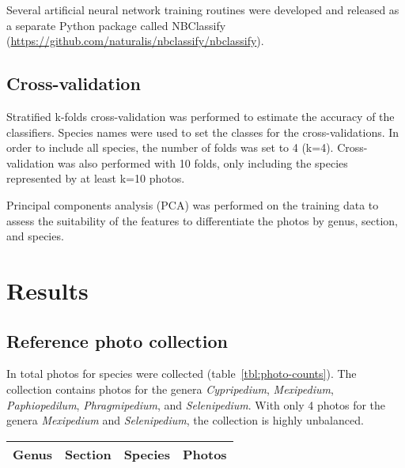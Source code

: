 \documentclass[review,3p,twocolumn]{elsarticle}
\begin{document}
Several artificial neural network training routines were developed and released as a separate Python package called NBClassify (\url{https://github.com/naturalis/nbclassify/nbclassify}).

\subsection{Cross-validation}

Stratified k-folds cross-validation was performed to estimate the accuracy of the classifiers. Species names were used to set the classes for the cross-validations. In order to include all species, the number of folds was set to 4 (k=4). Cross-validation was also performed with 10 folds, only including the species represented by at least k=10 photos.

Principal components analysis (PCA) was performed on the training data to assess the suitability of the features to differentiate the photos by genus, section, and species.

\section{Results}
\label{sect:results}

\subsection{Reference photo collection}

In total {\PhotoCount} photos for {\SpeciesCount} species were collected (table~\ref{tbl:photo-counts}). The collection contains photos for the genera \textit{Cypripedium}, \textit{Mexipedium}, \textit{Paphiopedilum}, \textit{Phragmipedium}, and \textit{Selenipedium}. With only 4 photos for the genera \textit{Mexipedium} and \textit{Selenipedium}, the collection is highly unbalanced.

\begin{table*}[t]\footnotesize
    \caption{The number of photos collected per genus, as well as the number of sections and species per genus represented by the photo collection. A total of {\PhotoCount} photos for {\SpeciesCount} species were collected.}
    \begin{center}
    \begin{tabular}{llll}
    \toprule
    \textbf{Genus} & \textbf{Section} & \textbf{Species} & \textbf{Photos} \\
    \midrule
    
    \bottomrule
    \end{tabular}
    \end{center}
    \label{tbl:photo-counts}
\end{table*}
\end{document}
